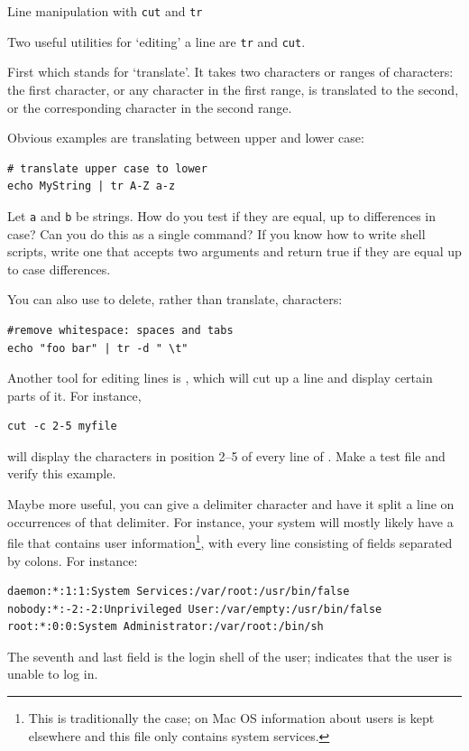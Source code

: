  {Line manipulation with \protect\texttt{cut} and \protect\texttt{tr}}

Two useful utilities for `editing' a line are \lstinline{tr} and \lstinline{cut}.

First  which stands for `translate'.
It takes two characters or ranges of characters:
the first character, or any character in the first range,
is translated to the second, or the corresponding character in the second range.

Obvious examples are translating between upper and lower case:
\begin{lstlisting}
# translate upper case to lower
echo MyString | tr A-Z a-z
\end{lstlisting}

\begin{exercise}
  Let \lstinline{a} and \lstinline{b} be strings.
  How do you test if they are equal, up to differences in case?
  Can you do this as a single command?
  If you know how to write shell scripts,
  write one that accepts two arguments and return true if they
  are equal up to case differences.
\end{exercise}

You can also use  to delete, rather than translate,
characters:
\begin{lstlisting}
#remove whitespace: spaces and tabs
echo "foo bar" | tr -d " \t"
\end{lstlisting}

Another tool for editing lines is , which will cut up a line
and display certain parts of it. For instance,
\begin{lstlisting}
cut -c 2-5 myfile
\end{lstlisting}
will display the characters in position 2--5 of every line of
. Make a test file and verify this example.

Maybe more useful, you can give  a delimiter character and have
it split a line on occurrences of that delimiter. For instance, your system
will mostly likely have a file  that contains user
information\footnote{This is traditionally the case; on Mac OS
  information about users is kept elsewhere and this file only
  contains system services.}, with every line consisting of fields
separated by colons. For instance:
\begin{lstlisting}
daemon:*:1:1:System Services:/var/root:/usr/bin/false
nobody:*:-2:-2:Unprivileged User:/var/empty:/usr/bin/false
root:*:0:0:System Administrator:/var/root:/bin/sh
\end{lstlisting}
The seventh and last field is the login shell of the user;
 indicates that the user is unable to log in.


